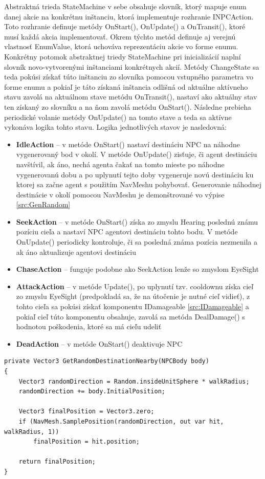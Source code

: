 \documentclass[slovak, master]{diploma}
\begin{document}
Abstraktná trieda StateMachine v sebe obsahuje slovník, ktorý mapuje enum danej akcie na konkrétnu inštanciu, ktorá implementuje rozhranie INPCAction. Toto rozhranie definuje metódy OnStart(), OnUpdate() a OnTransit(), ktoré musí každá akcia implementovať. Okrem týchto metód definuje aj verejnú vlastnosť EnumValue, ktorá uchováva reprezentáciu akcie vo forme enumu. Konkrétny potomok abstraktnej triedy StateMachine pri inicializácií naplní slovník novo-vytvorenými inštanciami konkrétnych akcií. Metódy ChangeState sa teda pokúsi získať túto inštanciu zo slovníka pomocou vstupného parametra vo forme enumu a pokiaľ je táto získaná inštancia odlišná od aktuálne aktívneho stavu zavolá na aktuálnom stave metódu OnTransit(), nastaví ako aktuálny stav ten získaný zo slovníku a na ňom zavolá metódu OnStart(). Následne prebieha periodické volanie metódy OnUpdate() na tomto stave a teda sa aktívne vykonáva logika tohto stavu. Logika jednotlivých stavov je nasledovná:
\begin{itemize}
  \item \textbf{IdleAction} -- v metóde OnStart() nastaví destináciu NPC na náhodne vygenerovaný bod v okolí. V metóde OnUpdate() zisťuje, či agent destináciu navštívil, ak áno, nechá agenta čakať na tomto mieste po náhodne vygenerovanú dobu a po uplynutí tejto doby vygeneruje novú destináciu ku ktorej sa začne agent s použitím NavMeshu pohybovať. Generovanie náhodnej destinácie v okolí pomocou NavMeshu je demonštrované vo výpise \ref{src:GenRandom}
  \item \textbf{SeekAction} -- v metóde OnStart() získa zo zmyslu Hearing poslednú známu pozíciu cieľa a nastaví NPC agentovi destináciu tohto bodu. V metóde OnUpdate() periodicky kontroluje, či sa posledná známa pozícia nezmenila a ak áno aktualizuje agentovi destináciu
  \item \textbf{ChaseAction} -- funguje podobne ako SeekAction lenže so zmyslom EyeSight
  \item \textbf{AttackAction} -- v metóde Update(), po uplynutí tzv. cooldownu získa cieľ zo zmyslu EyeSight (predpokladá sa, že na útočenie je nutné cieľ vidieť), z tohto cieľa sa pokúsi získať komponentu IDamageable \ref{src:IDamageable} a pokiaľ cieľ túto komponentu obsahuje, zavolá sa metóda DealDamage() s hodnotou poškodenia, ktoré sa má cieľu udeliť
  \item \textbf{DeadAction} -- v metóde OnStart() deaktivuje NPC
\end{itemize}

\vspace{8pt}
\begin{lstlisting}[label=src:GenRandom,caption={Generovanie náhodného bodu v okolí NPC pomocou NavMeshu}]
private Vector3 GetRandomDestinationNearby(NPCBody body)
{
    Vector3 randomDirection = Random.insideUnitSphere * walkRadius;
    randomDirection += body.InitialPosition;
    
    Vector3 finalPosition = Vector3.zero;
    if (NavMesh.SamplePosition(randomDirection, out var hit, walkRadius, 1))
        finalPosition = hit.position;

    return finalPosition;
}
\end{lstlisting}
\end{document}
